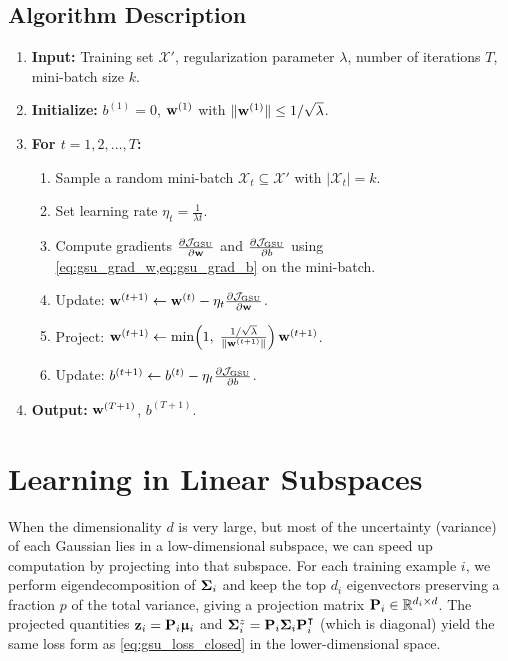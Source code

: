 \documentclass[11pt, letterpaper]{article}
\newcommand{\bSigma}{\vb{\Sigma}}
\newcommand{\bmu}{\boldsymbol{\upmu}}
\newcommand{\R}{\mathbb{R}}
\newcommand{\setX}{\mathcal{X}}
\newcommand{\obj}{\mathcal{J}}
\begin{document}
\subsection{Algorithm Description}

\begin{enumerate}[leftmargin=2em]
    \item \textbf{Input:} Training set $\setX'$, regularization parameter $\lambda$, number of iterations $T$, mini-batch size $k$.
    \item \textbf{Initialize:} $b^{(1)} = 0$, $\vb{w}^{(1)}$ with $\|\vb{w}^{(1)}\| \leq 1/\sqrt{\lambda}$.
    \item \textbf{For $t = 1, 2, \ldots, T$:}
    \begin{enumerate}
        \item Sample a random mini-batch $\setX_t \subseteq \setX'$ with $|\setX_t| = k$.
        \item Set learning rate $\eta_t = \frac{1}{\lambda t}$.
        \item Compute gradients $\pdv{\obj_{\text{GSU}}}{\vb{w}}$ and $\pdv{\obj_{\text{GSU}}}{b}$ using \cref{eq:gsu_grad_w,eq:gsu_grad_b} on the mini-batch.
        \item Update: $\vb{w}^{(t+1)} \leftarrow \vb{w}^{(t)} - \eta_t \pdv{\obj_{\text{GSU}}}{\vb{w}}$.
        \item Project: $\vb{w}^{(t+1)} \leftarrow \min\!\left(1,\; \frac{1/\sqrt{\lambda}}{\|\vb{w}^{(t+1)}\|}\right) \vb{w}^{(t+1)}$.
        \item Update: $b^{(t+1)} \leftarrow b^{(t)} - \eta_t \pdv{\obj_{\text{GSU}}}{b}$.
    \end{enumerate}
    \item \textbf{Output:} $\vb{w}^{(T+1)}$, $b^{(T+1)}$.
\end{enumerate}

\section{Learning in Linear Subspaces}\label{sec:subspace}

When the dimensionality $d$ is very large, but most of the uncertainty (variance) of each Gaussian lies in a low-dimensional subspace, we can speed up computation by projecting into that subspace. For each training example $i$, we perform eigendecomposition of $\bSigma_i$ and keep the top $d_i$ eigenvectors preserving a fraction $p$ of the total variance, giving a projection matrix $\vb{P}_i \in \R^{d_i \times d}$. The projected quantities $\vb{z}_i = \vb{P}_i \bmu_i$ and $\bSigma_i^z = \vb{P}_i \bSigma_i \vb{P}_i^{\intercal}$ (which is diagonal) yield the same loss form as \cref{eq:gsu_loss_closed} in the lower-dimensional space.
\end{document}

